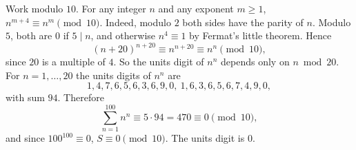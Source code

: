 Work modulo \(10\). For any integer \(n\) and any exponent \(m\ge 1\), \(n^{m+4}\equiv n^m\pmod{10}\). Indeed, modulo \(2\) both sides have the parity of \(n\). Modulo \(5\), both are \(0\) if \(5\mid n\), and otherwise \(n^4\equiv 1\) by Fermat's little theorem. Hence
\[
(n+20)^{n+20}\equiv n^{n+20}\equiv n^{n}\pmod{10},
\]
since \(20\) is a multiple of \(4\). So the units digit of \(n^n\) depends only on \(n\bmod 20\). For \(n=1,\dots,20\) the units digits of \(n^n\) are
\[
1,4,7,6,5,6,3,6,9,0,\ 1,6,3,6,5,6,7,4,9,0,
\]
with sum \(94\). Therefore
\[
\sum_{n=1}^{100}n^n\equiv 5\cdot 94=470\equiv 0\pmod{10},
\]
and since \(100^{100}\equiv 0\), \(S\equiv 0\pmod{10}\). The units digit is \(\boxed{0}\).
